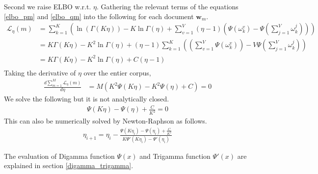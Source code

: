 \documentclass[a4]{article}
\begin{document}
Second we raise ELBO w.r.t. $\eta$.
Gathering the relevant terms of the equations \ref{elbo_pm} and \ref{elbo_qm}
into the following for each document $\mathbf{w}_m$.
\begin{equation}
\begin{aligned}
    \mathcal{L}_{\eta}(m)
    &=
      \sum_{k=1}^K
      \left(
          \ln \left( \Gamma( K\eta ) \right) 
          - K\ln \Gamma(\eta) 
          + \sum_{v=1}^{V} (\eta - 1) 
               ( \Psi( \omega_{k}^v ) - \Psi( \sum_{j=1}^{V} \omega_{k}^j ))
      \right)\\
    &=
      K \Gamma( K\eta )
    - K^2\ln \Gamma(\eta)  
    + (\eta - 1) \sum_{k=1}^K \left(
      \left(\sum_{v=1}^{V} \Psi( \omega_{k}^v ) \right)
    - V \Psi( \sum_{j=1}^{V} \omega_{k}^j ) \right)\\
    &=
      K \Gamma( K\eta )
    - K^2\ln \Gamma(\eta)  
    + C (\eta - 1) \\
\end{aligned}
\end{equation}
Taking the derivative of $\eta$ over the entier corpus,
\begin{equation}
\begin{aligned}
    \frac{d \sum_{m=1}^M \mathcal{L}_{\eta}(m)}{d\eta}
    &= M (K^2\Psi( K\eta ) - K^2\Psi(\eta) + C )= 0
\end{aligned}
\end{equation}
We solve the following but it is not analytically closed.
\begin{equation}
\begin{aligned}
    \Psi( K\eta ) - \Psi(\eta) + \frac{C}{K^2} = 0
\end{aligned}
\end{equation}
This can also be numerically solved by Newton-Raphson as follows.
\begin{equation}
\begin{aligned}
\eta_{i+1} = \eta_i - \frac
                          { \Psi( K\eta_i ) - \Psi(\eta_i) + \frac{C}{K^2} }
                          { K\Psi'( K\eta_i ) - \Psi'(\eta_i) }
\end{aligned}
\end{equation}

The evaluation of Digamma function $\Psi(x)$ and Trigamma function $\Psi'(x)$
are explained in section \ref{digamma_trigamma}.




\end{document}
